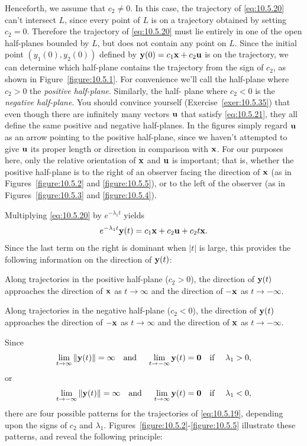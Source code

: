 Henceforth, we assume that $c_{2}\ne0$. In this case, the trajectory of \eqref{eq:10.5.20} can't
intersect $L$, since every point of $L$ is on a trajectory obtained by setting $c_{2}=0$. Therefore
the trajectory of \eqref{eq:10.5.20} must lie entirely in one of the open half-planes bounded by
$L$, but does not contain any point on $L$. Since the initial point $(y_{1}(0),y_{2}(0))$ defined by
${\bf y}(0)=c_{1}{\bf x}+c_{2}{\bf u}$ is on the trajectory, we can determine which half-plane
contains the trajectory from the sign of $c_{2}$, as shown in Figure~\ref{figure:10.5.1}. For
convenience we'll call the half-plane where $c_{2}>0$ the {\color{blue}\it positive half-plane\/}.
Similarly, the half- plane where $c_{2}<0$ is the {\color{blue}\it negative half-plane\/}. You should
convince yourself (Exercise~\ref{exer:10.5.35}) that even though there are infinitely many vectors
${\bf u}$ that satisfy \eqref{eq:10.5.21}, they all define the same positive and negative
half-planes. In the figures simply regard ${\bf u}$ as an arrow pointing to the positive half-plane,
since we haven't attempted to give ${\bf u}$ its proper length or direction in comparison with
${\bf x}$. For our purposes here, only the relative orientation of ${\bf x}$ and ${\bf u}$ is
important; that is, whether the positive half-plane is to the right of an observer facing the
direction of ${\bf x}$ (as in Figures~\ref{figure:10.5.2} and \ref{figure:10.5.5}), or to the left
of the observer (as in Figures~\ref{figure:10.5.3} and \ref{figure:10.5.4}).

Multiplying \eqref{eq:10.5.20} by $e^{-\lambda_{1}t}$ yields
\[
  e^{-\lambda_{1}t}{\bf y}(t)=c_{1}{\bf x}+c_{2}{\bf u}+c_{2}t{\bf x}.
\]
Since the last term on the right is dominant when $|t|$ is large, this provides the following
information on the direction of ${\bf y}(t)$:
\begin{alist}
  \item %
  Along trajectories in the positive half-plane ($c_{2}>0$), the direction of ${\bf y}(t)$
  approaches the direction of ${\bf x}$ as $t\to\infty$ and the direction of $-{\bf x}$ as
  $t\to-\infty$.

  \item %
  Along trajectories in the negative half-plane ($c_{2}<0$), the direction of ${\bf y}(t)$
  approaches the direction of $-{\bf x}$ as $t\to\infty$ and the direction of ${\bf x}$ as
  $t\to-\infty$.
\end{alist}

Since
\[
  \lim_{t\to\infty}\|{\bf y}(t)\|=\infty\mbox{\quad and \quad}\lim_{t\to-\infty}{\bf y}(t)={\bf0}\mbox{\quad if \quad}\lambda_{1}>0,
\]
or
\[
  \lim_{t\to-\infty}\|{\bf y}(t)\|=\infty\mbox{\quad and \quad}\lim_{t\to\infty}{\bf y}(t)={\bf0}\mbox{\quad if \quad}\lambda_{1}<0,
\]
there are four possible patterns for the trajectories of \eqref{eq:10.5.19}, depending upon the
signs of $c_{2}$ and $\lambda_{1}$. Figures~\ref{figure:10.5.2}-\ref{figure:10.5.5} illustrate these
patterns, and reveal the following principle:

